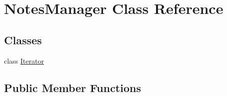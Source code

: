 \hypertarget{class_notes_manager}{}\section{Notes\+Manager Class Reference}
\label{class_notes_manager}
\subsection*{Classes}
\begin{DoxyCompactItemize}
\item 
class \hyperlink{class_notes_manager_1_1_iterator}{Iterator}
\end{DoxyCompactItemize}
\subsection*{Public Member Functions}

